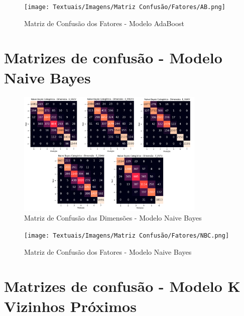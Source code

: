 \begin{apendicesenv}
\begin{figure}[ht]
    \centering
    \texttt{[image: Textuais/Imagens/Matriz Confusão/Fatores/AB.png]}
    \caption{Matriz de Confusão dos Fatores - Modelo AdaBoost}
    \label{fig:matriz_confusao_fat_ab}
\end{figure}

                      \chapter{Matrizes de confusão - Modelo Naive Bayes}
                      \label{ap4}

\begin{figure}[ht]
    \centering
    \includegraphics[width=0.8\textwidth]{Textuais/Imagens/Matriz Confusão/Dimensões/dim_nb.png}
    \caption{Matriz de Confusão das Dimensões - Modelo Naive Bayes}
    \label{fig:matriz_confusao_dim_nbc}
\end{figure}

\begin{figure}[ht]
    \centering
    \texttt{[image: Textuais/Imagens/Matriz Confusão/Fatores/NBC.png]}
    \caption{Matriz de Confusão dos Fatores - Modelo Naive Bayes}
    \label{fig:matriz_confusao_fat_nbc}
\end{figure}

                      \chapter{Matrizes de confusão - Modelo K Vizinhos Próximos}
                      \label{ap5}


\end{apendicesenv}
